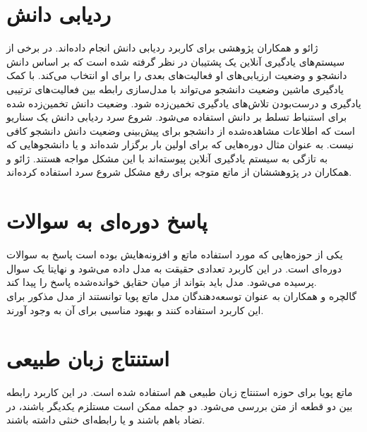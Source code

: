 \section{ردیابی دانش}
ژائو و همکاران پژوهشی برای کاربرد ردیابی دانش انجام داده‌اند. در برخی از سیستم‌های یادگیری آنلاین یک پشتیبان در نظر گرفته شده است که بر اساس دانش دانشجو و وضعیت ارزیابی‌های او فعالیت‌های بعدی را برای او انتخاب می‌کند. با کمک یادگیری ماشین وضعیت دانشجو می‌تواند با مدل‌سازی رابطه بین فعالیت‌های ترتیبی یادگیری و درست‌بودن تلاش‌های یادگیری تخمین‌زده شود. وضعیت دانش تخمین‌زده شده برای استنباط تسلط بر دانش استفاده می‌شود. شروع سرد ردیابی دانش یک سناریو است که اطلاعات مشاهده‌شده از دانشجو برای پیش‌بینی وضعیت دانش دانشجو کافی نیست. به عنوان مثال دوره‌هایی که برای اولین بار برگزار شده‌اند و یا دانشجوهایی که به تازگی به سیستم یادگیری آنلاین پیوسته‌اند با این مشکل مواجه هستند. ژائو و همکاران در پژوهششان از ماتع متوجه برای رفع مشکل شروع سرد استفاده کرده‌اند.\cite{zhao2020cold}

\section{پاسخ دوره‌ای به سوالات}
یکی از حوزه‌هایی که مورد استفاده ماتع و افزونه‌هایش بوده است پاسخ به سوالات دوره‌ای است. در این کاربرد تعدادی حقیقت به مدل داده می‌شود و نهایتا یک سوال پرسیده می‌شود. مدل باید بتواند از میان حقایق خوانده‌شده پاسخ را پیدا کند.
\\

گالچره و همکاران به عنوان توسعه‌دهندگان مدل ماتع پویا توانستند از مدل مذکور برای این کاربرد استفاده کنند و بهبود مناسبی برای آن به وجود آورند.\cite{gulcehre2018dynamic}

\section{استنتاج زبان طبیعی}
ماتع پویا برای حوزه استنتاج زبان طبیعی هم استفاده شده است.\cite{gulcehre2018dynamic} در این کاربرد رابطه بین دو قطعه از متن بررسی می‌شود. دو جمله ممکن است مستلزم یکدیگر باشند، در تضاد باهم باشند و یا رابطه‌ای خنثی داشته باشند.
